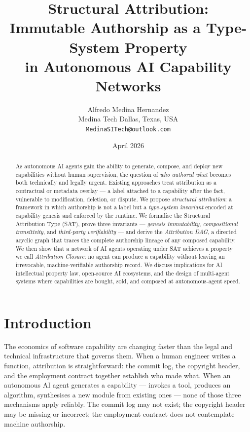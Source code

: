 \documentclass[12pt]{article}
\title{\textbf{Structural Attribution: \\
  Immutable Authorship as a Type-System Property \\
  in Autonomous AI Capability Networks}}
\author{Alfredo Medina Hernandez \\
  \normalsize Medina Tech \quad Dallas, Texas, USA \\
  \normalsize \texttt{MedinaSITech@outlook.com}}
\date{April 2026}
\begin{document}
\maketitle

\begin{abstract}
As autonomous AI agents gain the ability to generate, compose, and deploy new
capabilities without human supervision, the question of \emph{who authored what}
becomes both technically and legally urgent.  Existing approaches treat
attribution as a contractual or metadata overlay — a label attached to a
capability after the fact, vulnerable to modification, deletion, or dispute.
We propose \emph{structural attribution}: a framework in which authorship is not
a label but a \emph{type-system invariant} encoded at capability genesis and
enforced by the runtime.  We formalise the Structural Attribution Type (SAT),
prove three invariants — \emph{genesis immutability}, \emph{compositional
transitivity}, and \emph{third-party verifiability} — and derive the
\emph{Attribution DAG}, a directed acyclic graph that traces the complete
authorship lineage of any composed capability.  We then show that a network of
AI agents operating under SAT achieves a property we call \emph{Attribution
Closure}: no agent can produce a capability without leaving an irrevocable,
machine-verifiable authorship record.  We discuss implications for AI
intellectual property law, open-source AI ecosystems, and the design of
multi-agent systems where capabilities are bought, sold, and composed at
autonomous-agent speed.
\end{abstract}

\section{Introduction}
\label{sec:intro}

The economics of software capability are changing faster than the legal and
technical infrastructure that governs them.  When a human engineer writes a
function, attribution is straightforward: the commit log, the copyright header,
and the employment contract together establish who made what.  When an
autonomous AI agent generates a capability — invokes a tool, produces an
algorithm, synthesises a new module from existing ones — none of those three
mechanisms apply reliably.  The commit log may not exist; the copyright header
may be missing or incorrect; the employment contract does not contemplate machine
authorship.
\end{document}
